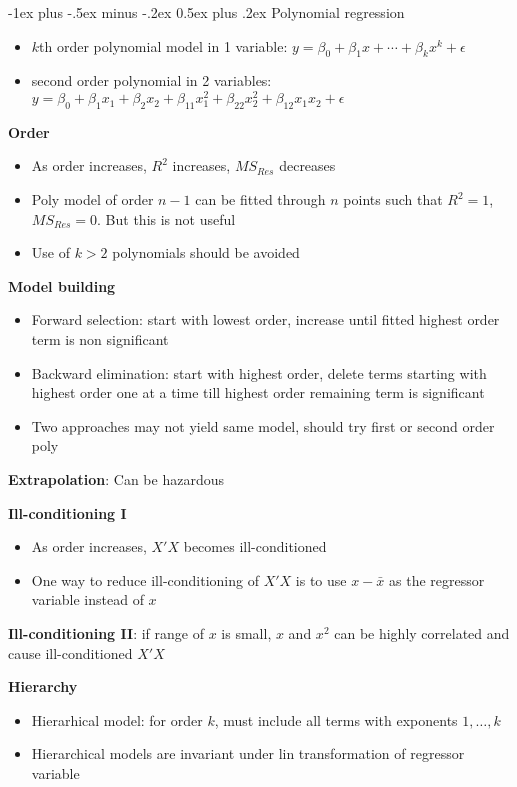 \documentclass[frenchspacing,9pt,landscape,a4paper]{article}
\makeatletter
\renewcommand{\section}{\@startsection{section}{1}{0mm}%
                                {-1ex plus -.5ex minus -.2ex}%
                                {0.5ex plus .2ex}%
                                {\normalfont\large\bfseries}}
\makeatother
\begin{document}
\begin{multicols}{3}
\section{Polynomial regression}
\begin{itemize}
	\item $k$th order polynomial model in 1 variable: $y=\beta_0+\beta_1x+\cdots+\beta_kx^k+\epsilon$
	\item second order polynomial in 2 variables: $y=\beta_0+\beta_1x_1+\beta_2x_2+\beta_{11}x_1^2+\beta_{22}x_2^2+\beta_{12}x_1x_2+\epsilon$
\end{itemize}
\textbf{Order}
\begin{itemize}
	\item As order increases, $R^2$ increases,  $MS_{Res}$ decreases
	\item Poly model of order  $n-1$ can be fitted through  $n$ points such that  $R^2=1$, $MS_{Res}=0$. But this is not useful
	\item Use of $k>2$ polynomials should be avoided
\end{itemize} 
\textbf{Model building}
\begin{itemize}
	\item Forward selection: start with lowest order, increase until fitted highest order term is non significant
	\item Backward elimination: start with highest order, delete terms starting with highest order one at a time till highest order remaining term is significant
	\item Two approaches may not yield same model, should try first or second order poly
\end{itemize}
\textbf{Extrapolation}: Can be hazardous

\textbf{Ill-conditioning I}
\begin{itemize}
	\item As order increases, $X'X$ becomes ill-conditioned 
	\item One way to reduce ill-conditioning of $X'X$ is to use  $x-\bar{x}$ as the regressor variable instead of  $x$
\end{itemize}
\textbf{Ill-conditioning II}: if range of $x$ is small,  $x$ and  $x^2$ can be highly correlated and cause ill-conditioned  $X'X$

\textbf{Hierarchy}
\begin{itemize}
	\item Hierarhical model: for order $k$, must include all terms with exponents  $1,\dots,k$
	\item Hierarchical models are invariant under lin transformation of regressor variable
\end{itemize}

\end{multicols}
\end{document}
